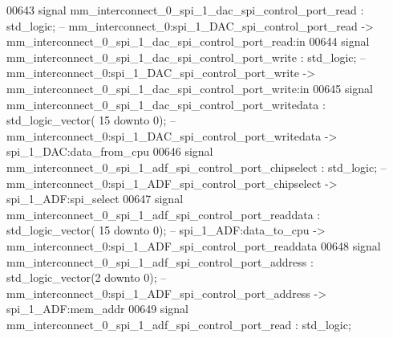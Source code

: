 \begin{DoxyCode}
00643     \textcolor{keywordflow}{signal} \textcolor{vhdlchar}{mm_interconnect_0_spi_1_dac_spi_control_port_read}                           \textcolor{vhdlchar}{:} \textcolor{comment}{std\_logic};\textcolor{keyword}{        
                   -- mm\_interconnect\_0:spi\_1\_DAC\_spi\_control\_port\_read ->
       mm\_interconnect\_0\_spi\_1\_dac\_spi\_control\_port\_read:in}
00644     \textcolor{keywordflow}{signal} \textcolor{vhdlchar}{mm_interconnect_0_spi_1_dac_spi_control_port_write}                          \textcolor{vhdlchar}{:} \textcolor{comment}{std\_logic};\textcolor{keyword}{        
                   -- mm\_interconnect\_0:spi\_1\_DAC\_spi\_control\_port\_write ->
       mm\_interconnect\_0\_spi\_1\_dac\_spi\_control\_port\_write:in}
00645     \textcolor{keywordflow}{signal} \textcolor{vhdlchar}{mm_interconnect_0_spi_1_dac_spi_control_port_writedata}                      \textcolor{vhdlchar}{:} \textcolor{comment}{std\_logic\_vector}\textcolor{vhdlchar}{(}\textcolor{vhdllogic}{}\textcolor{vhdllogic}{
      15} \textcolor{keywordflow}{downto} \textcolor{vhdllogic}{}\textcolor{vhdllogic}{0}\textcolor{vhdlchar}{)};\textcolor{keyword}{ -- mm\_interconnect\_0:spi\_1\_DAC\_spi\_control\_port\_writedata -> spi\_1\_DAC:data\_from\_cpu}
00646     \textcolor{keywordflow}{signal} \textcolor{vhdlchar}{mm_interconnect_0_spi_1_adf_spi_control_port_chipselect}                     \textcolor{vhdlchar}{:} \textcolor{comment}{std\_logic};\textcolor{keyword}{        
                   -- mm\_interconnect\_0:spi\_1\_ADF\_spi\_control\_port\_chipselect -> spi\_1\_ADF:spi\_select}
00647     \textcolor{keywordflow}{signal} \textcolor{vhdlchar}{mm_interconnect_0_spi_1_adf_spi_control_port_readdata}                       \textcolor{vhdlchar}{:} \textcolor{comment}{std\_logic\_vector}\textcolor{vhdlchar}{(}\textcolor{vhdllogic}{}\textcolor{vhdllogic}{
      15} \textcolor{keywordflow}{downto} \textcolor{vhdllogic}{}\textcolor{vhdllogic}{0}\textcolor{vhdlchar}{)};\textcolor{keyword}{ -- spi\_1\_ADF:data\_to\_cpu -> mm\_interconnect\_0:spi\_1\_ADF\_spi\_control\_port\_readdata}
00648     \textcolor{keywordflow}{signal} \textcolor{vhdlchar}{mm_interconnect_0_spi_1_adf_spi_control_port_address}                        \textcolor{vhdlchar}{:} \textcolor{comment}{std\_logic\_vector}\textcolor{vhdlchar}{(}\textcolor{vhdllogic}{}\textcolor{vhdllogic}{2}
       \textcolor{keywordflow}{downto} \textcolor{vhdllogic}{}\textcolor{vhdllogic}{0}\textcolor{vhdlchar}{)};\textcolor{keyword}{  -- mm\_interconnect\_0:spi\_1\_ADF\_spi\_control\_port\_address -> spi\_1\_ADF:mem\_addr}
00649     \textcolor{keywordflow}{signal} \textcolor{vhdlchar}{mm_interconnect_0_spi_1_adf_spi_control_port_read}                           \textcolor{vhdlchar}{:} \textcolor{comment}{std\_logic};\textcolor{keyword}{        
}
\end{DoxyCode}
